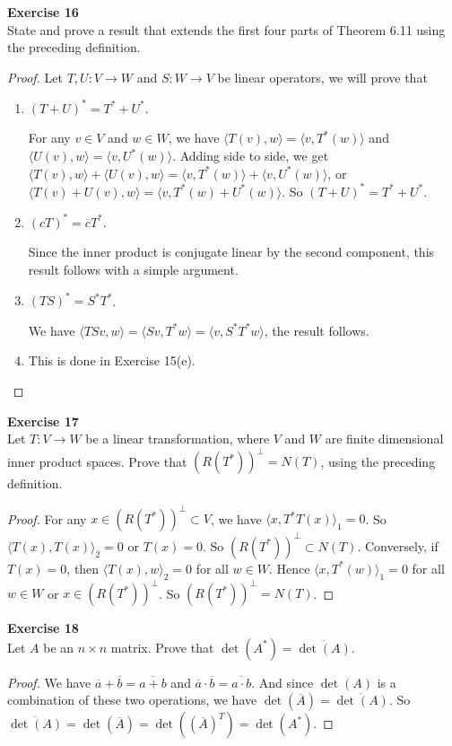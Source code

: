 \documentclass[12pt, a4paper]{article}
\theoremstyle{plain}
\newenvironment{exercise}[2][Exercise]
    { \begin{mdframed}[backgroundcolor=gray!20] \textbf{#1 #2} \\}
    {  \end{mdframed}}
\begin{document}
\begin{exercise}{16}
State and prove a result that extends the first four parts of Theorem 6.11 using the preceding definition.
\end{exercise}
	\begin{proof}
	Let $T,U:V\rightarrow W$ and $S:W\rightarrow V$ be linear operators, we will prove that
	\begin{enumerate}[label=(\alph*)]
	\item $(T+U)^*=T^*+U^*$. 
	
	For any $v\in V$ and $w\in W$, we have $\langle{T(v),w}\rangle = \langle{v,T^*(w)}\rangle$ and $\langle{U(v),w}\rangle = \langle{v,U^*(w)}\rangle$. Adding side to side, we get $\langle{T(v),w}\rangle + \langle{U(v),w}\rangle= \langle{v,T^*(w)}\rangle + \langle{v,U^*(w)}\rangle$, or $\langle{T(v)+U(v),w}\rangle = \langle{v,T^*(w)+U^*(w)}\rangle$. So $(T+U)^* = T^*+U^*$.
	\item $(cT)^* = \overline{c}T^*$. 
	
	Since the inner product is conjugate linear by the second component, this result follows with a simple argument.
	\item $(TS)^* = S^*T^*$.
	
	We have $\langle{TSv,w}\rangle = \langle{Sv,T^* w}\rangle = \langle{v,S^*T^*w}\rangle$, the result follows.
	
	\item This is done in Exercise 15(e).
	\end{enumerate}
	\end{proof}
	
\begin{exercise}{17}
Let $T:V\rightarrow W$ be a linear transformation, where $V$ and $W$ are finite dimensional inner product spaces. Prove that $(R(T^*))^\perp = N(T)$, using the preceding definition.
\end{exercise}
	\begin{proof}
	For any $x\in (R(T^*))^\perp\subset V$, we have $\langle{x,T^*T(x)}\rangle_1 = 0$. So $\langle{T(x),T(x)}\rangle_2 = 0$ or $T(x)=0$. So $(R(T^*))^\perp\subset N(T)$. Conversely, if $T(x)=0$, then $\langle{T(x),w}\rangle_2 = 0$ for all $w\in W$. Hence $\langle{x,T^*(w)}\rangle_1 = 0$ for all $w\in W$ or $x\in  (R(T^*))^\perp$. So $(R(T^*))^\perp = N(T)$.
	\end{proof}

\begin{exercise}{18}
Let $A$ be an $n\times n$ matrix. Prove that $\det (A^*)=\overline{\det(A)}$.
\end{exercise}
	\begin{proof}
	We have $\overline{a}+\overline{b} = \overline{a+b}$ and $\overline{a}\cdot\overline{b}=\overline{a\cdot b}$. And since $\det(A)$ is a combination of these two operations, we have $\det(\overline{A}) = \overline{\det(A)}$. So $\overline{\det(A)}=\det(\overline{A}) = \det((\overline{A})^T)=\det(A^*)$.
	\end{proof}
	
\end{document}
